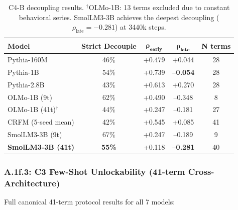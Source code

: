 \documentclass[10pt]{article} %
\begin{document}
\begin{table}[H]
\centering
\small
\begin{tabular}{|l|c|c|c|c|}
\hline
\textbf{Model} & \textbf{Strict Decouple} & $\mathbf{\rho_{\text{early}}}$ & $\mathbf{\rho_{\text{late}}}$ & \textbf{N terms} \\
\hline
Pythia-160M & 46\% & +0.479 & +0.044 & 28 \\
Pythia-1B & 54\% & +0.739 & \textbf{--0.054} & 28 \\
Pythia-2.8B & 43\% & +0.613 & +0.270 & 28 \\
OLMo-1B (9t) & 62\% & +0.490 & --0.348 & 8 \\
OLMo-1B (41t)$^\dagger$ & 44\% & +0.247 & --0.181 & 27 \\
CRFM (5-seed mean) & 42\% & +0.545 & +0.085 & 41 \\
SmolLM3-3B (9t) & 67\% & +0.247 & --0.189 & 9 \\
\textbf{SmolLM3-3B (41t)} & \textbf{55\%} & +0.118 & \textbf{--0.281} & 40 \\
\hline
\end{tabular}
\caption{C4-B decoupling results. $^\dagger$OLMo-1B: 13 terms excluded due to constant behavioral series. SmolLM3-3B achieves the deepest decoupling ($\rho_{\text{late}} = -0.281$) at 3440k steps.}
\label{tab:a1f2_c4b}
\end{table}

\subsubsection*{A.1f.3: C3 Few-Shot Unlockability (41-term Cross-Architecture)}

Full canonical 41-term protocol results for all 7 models:
\end{document}
